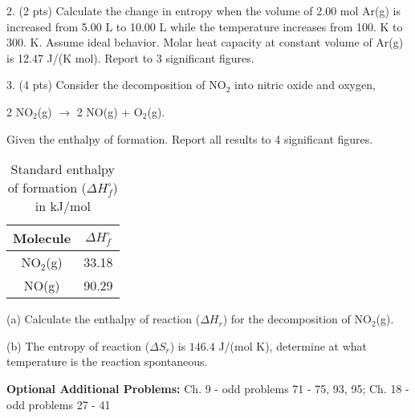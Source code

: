 \documentclass[11pt]{article}
\begin{document}
2. (2 pts) Calculate the change in entropy when the volume of 2.00 mol Ar(g) is increased
from 5.00 L to 10.00 L while the temperature increases from 100. K to 300. K. Assume
ideal behavior. Molar heat capacity at constant volume of Ar(g) is 12.47 J/(K mol).
Report to 3 significant figures.


\vspace{2in}

3. (4 pts) Consider the decomposition of NO$_2$ into nitric oxide and oxygen,
\begin{center}
  2 NO$_2$(g) $\rightarrow$ 2 NO(g) + O$_2$(g).
\end{center}
Given the enthalpy of formation. Report all results to 4 significant figures.

\begin{table}[hbpt]
  \caption{Standard enthalpy of formation ($\Delta H^\circ_f$)
    in kJ/mol}
  \centering
  \begin{tabular}{c|c}
    Molecule & $\Delta H^\circ_f$ \\
    \hline
    NO$_2$(g) & 33.18  \\
    NO(g)     & 90.29
  \end{tabular}
\end{table}

(a) Calculate the enthalpy of reaction ($\Delta H_r$) for the decomposition of NO$_2$(g).

(b) The entropy of reaction ($\Delta S_r$) is $146.4$ J/(mol K), determine at what temperature
is the reaction spontaneous.


%
%
%
%
%
%
%


\vfill
\textbf{Optional Additional Problems:} Ch. 9 - odd problems 71 - 75, 93, 95; Ch. 18
- odd problems 27 - 41
\end{document}
